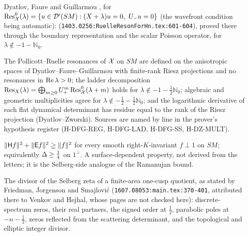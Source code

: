 \begin{citedfact}
\label{cit:dfg-first-band-pushforward}
Dyatlov, Faure and Guillarmou \cite{dyatlov2015power}, for $\operatorname{Res}^0_{\mathcal X}(\lambda) = \{u\in\mathcal D'(SM):
(X+\lambda)u = 0,\ U_-u = 0\}$ (the wavefront condition being automatic):
\texttt{}
(\texttt{1403.0256:RuelleResonForHn.tex:601-604}), proved there through the boundary
representation and the scalar Poisson operator, for $\lambda\notin-1-\mathbb N_0$.
\end{citedfact}

\begin{assumption}
\label{asm:dfg-resonance-theory}
The Pollicott--Ruelle resonances of $\mathcal X$ on $SM$ are defined on the anisotropic spaces of
Dyatlov--Faure--Guillarmou with finite-rank Riesz projections and no resonances in $\operatorname{Re}\lambda>0$;
the ladder decomposition $\operatorname{Res}_X(\lambda) = \bigoplus_{m\ge0}U_+^m\operatorname{Res}^0_{\mathcal X}(\lambda+m)$
holds for $\lambda\notin-1-\tfrac12\mathbb N_0$; algebraic and geometric multiplicities agree for
$\lambda\notin-\tfrac12-\tfrac12\mathbb N_0$; and the logarithmic derivative of each flat
dynamical determinant has residue equal to the rank of the Riesz projection (Dyatlov--Zworski).
Sources are named by line in the prover's hypothesis register (H-DFG-REG, H-DFG-LAD, H-DFG-SS,
H-DZ-MULT).
\end{assumption}

\begin{assumption}
\label{asm:selberg-coercivity}
$\|\mathsf H f\|^2+\|\mathsf E f\|^2\ge\|f\|^2$ for every smooth right-$K$-invariant $f\perp1$ on $SM$;
equivalently $\Delta\ge\tfrac14$ on $1^\perp$. A surface-dependent property, not derived from the
letters; it is the Selberg-side analogue of the Ramanujan bound.
\end{assumption}

\begin{assumption}
\label{asm:cusp-divisor-theorem}
The divisor of the Selberg zeta of a finite-area one-cusp quotient, as stated by Friedman,
Jorgenson and Smajlovi\'c \cite{friedman2016central} (\texttt{1607.08053:main.tex:370-401},
attributed there to Venkov and Hejhal, whose pages are not checked here): discrete-spectrum zeros,
their real partners, the signed order at $\tfrac12$, parabolic poles at $-n-\tfrac12$, zeros
reflected from the scattering determinant, and the topological and elliptic integer divisor.
\end{assumption}

